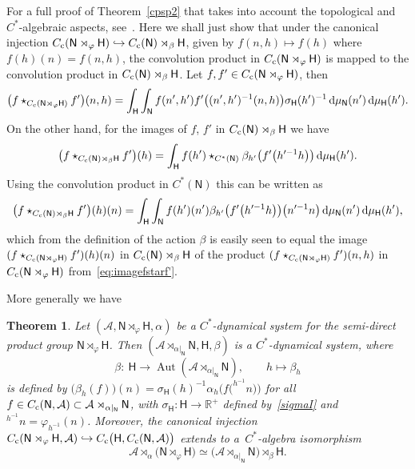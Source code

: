 \documentclass[10pt,a4paper]{amsart}
\numberwithin{equation}{section}
\def\dd{{\rm d}}
\newcommand{\sfH}{\mathsf{H}}
\newcommand{\sfN}{\mathsf{N}}
\newcommand{\Aut}{\operatorname{Aut}}
\newcommand{\real}{{\mathbb R}} %
\def\alg{{\mathcal A}}
\newtheorem{Theorem}{Theorem}[section]
\begin{document}
For a full
proof of Theorem~\ref{cpsp2} that takes into account the topological
and $C^*$-algebraic aspects, see~\cite[Proposition~3.11]{Williams2007}. Here
we shall just show that under the canonical injection $C_{\rm c}(\sfN \rtimes_\varphi \sfH )\hookrightarrow
C_{\rm c}(\sfN )\rtimes_\beta \sfH $, given by $f(n,h)\mapsto f(h)$ where
$f(h)(n)=f(n,h)$, the convolution product in $C_{\rm c}(\sfN \rtimes_\varphi
\sfH )$ is mapped to the convolution product in $C_{\rm c}(\sfN )\rtimes_\beta \sfH $.
Let $f,f'\in C_{\rm c}(\sfN \rtimes_\varphi \sfH )$, then
\begin{gather}\label{eq:imagefstarf'}
\big(f\star_{C_{\rm c}(\sfN \rtimes_\varphi
 \sfH )}f'\big)(n,h)=\int_\sfH \int_\sfN f(n',h')
f'\big((n',h')^{-1} (n,h)\big) \sigma_\sfH(h')^{-1} \, \dd\mu_\sfN (n') \, \dd\mu_\sfH (h').
\end{gather}
On the other hand, for the images of $f$, $f'$ in $C_{\rm c}(\sfN
)\rtimes_\beta \sfH $ we have
\[
\big(f\star_{C_{\rm c}(\sfN )\rtimes_\beta
 \sfH }f'\big)(h)=\int_\sfH f(h')\star_{C^*(\sfN
 )}\beta_{h'}\big(f'\big(h'^{-1} h\big)\big) \, \dd\mu_\sfH (h') .
\]
Using the convolution product in $C^*(\sfN)$ this can be written as
\begin{align*}
\big(f\star_{C_{\rm c}(\sfN )\rtimes_\beta
 \sfH }f'\big)(h)(n)=\int_\sfH \int_\sfN
 f(h')(n') \beta_{h'}\big(f'\big(h'^{-1} h\big)\big)\big(n'^{-1} n\big)
\, \dd\mu_\sfN (n') \, \dd\mu_\sfH (h') ,
\end{align*}
which from the definition of the action $\beta$ is easily seen to
equal the image $(f\star_{C_{\rm c}(\sfN \rtimes_\varphi \sfH
 )}f')(h)(n)$ in $C_{\rm c}(\sfN )\rtimes_\beta
 \sfH $ of the product $(f\star_{C_{\rm c}(\sfN \rtimes_\varphi
 \sfH )}f')(n,h)$ in $C_{\rm c}(\sfN \rtimes_\varphi
\sfH )$ from~\eqref{eq:imagefstarf'}.

More generally we have~\cite[Proposition~3.11]{Williams2007}
\begin{Theorem}\label{cpsp3}
Let $(\alg,\sfN \rtimes_\varphi \sfH ,\alpha)$ be a $C^*$-dynamical
system for the semi-direct product group $\sfN \rtimes_\varphi \sfH $. Then $(\alg\rtimes_{\alpha|_\sfN }\sfN ,\sfH ,\beta)$ is a $C^*$-dynamical
system, where
\[
\beta\colon \ \sfH \longrightarrow \Aut(\alg\rtimes_{\alpha|_\sfN }\sfN ) ,
\qquad h\longmapsto \beta_h
\]
is defined by
$\big(\beta_h(f)\big)(n)=\sigma_\sfH(h)^{-1} \alpha_h\big(f\big(^{h^{-1\!}}n\big)\big)$
for all $f\in C_{\rm c}(\sfN ,\alg)\subset \alg\rtimes_{\alpha|_\sfN }\sfN $, with $\sigma_\sfH\colon
\sfH \to \real^+$ defined by~\eqref{sigmaI} and $^{h^{-1\!}}n=\varphi_{h^{-1}}(n)$.
Moreover, the canonical injection $C_{\rm c}(\sfN \rtimes_\varphi \sfH ,\alg)\hookrightarrow
C_{\rm c}\big(\sfH ,C_{\rm c}(\sfN ,\alg)\big)$
extends to a~$C^*$-algebra isomorphism
\[
\alg\rtimes_{\alpha}\big(\sfN \rtimes_\varphi
\sfH \big) \simeq \big(\alg\rtimes_{\alpha|_\sfN } \sfN
\big)\rtimes_\beta \sfH .
\]
\end{Theorem}
\end{document}
